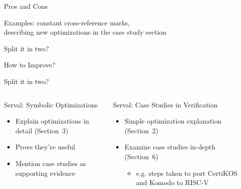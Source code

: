 \documentclass[10pt,aspectratio=169]{beamer}
\begin{document}
\begin{frame}[t]{Pros and Cons}
\begin{center}
{    {\Large Examples: constant cross-reference marks,\\describing new optimizations in the case study section}
    
    
    
    {\Large Split it in two?}
    }
\end{center}
\vfill\null

\end{frame}

\begin{frame}{How to Improve?}
\begin{center}
\vfill\null    
    {\Large Split it in two?}
\vfill\null    
\begin{columns}[T]
\begin{block}{Serval: Symbolic Optimizations}
    \begin{itemize}
        \item Explain optimizations in detail (Section~3)
        \item Prove they're useful
        \item Mention case studies as supporting evidence
    \end{itemize}
\end{block}
\begin{block}{Serval: Case Studies in Verification}
    \begin{itemize}
        \item Simple optimization explanation (Section~2)
        \item Examine case studies in-depth (Section~6)
        \begin{itemize}
            \item e.g. steps taken to port CertiKOS and Komodo to RISC-V
        \end{itemize}
    \end{itemize}
\end{block}
\end{columns}
\vfill\null  
\end{center}
\end{frame}
\end{document}

